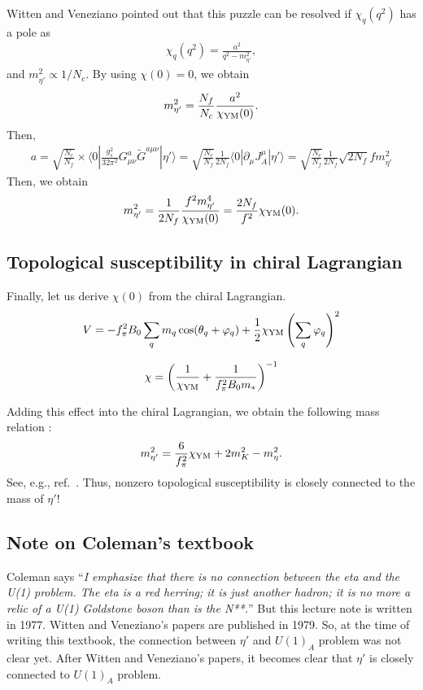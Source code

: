 \documentclass[11pt,a4paper]{article}
\begin{document}
Witten and Veneziano \cite{Witten:1979vv, Veneziano:1979ec} pointed out that this puzzle can be resolved if $\chi_q(q^2)$ has a pole as
\begin{align}
    \chi_q(q^2) = \frac{a^2}{q^2 - m_{\eta'}^2},
\end{align}
and $m_{\eta'}^2 \propto 1/N_c$. By using $\chi(0)=0$, we obtain
\begin{align}
    m_{\eta'}^2 = \frac{N_f}{N_c} \frac{a^2}{\chi_{\rm YM}(0)}.
\end{align}
Then,
\begin{align}
    a = \sqrt{ \frac{N_c}{N_f} } \times \langle 0| \frac{g_s^2}{32\pi^2} G^a_{\mu\nu} \tilde G^{a\mu\nu} |\eta'\rangle = \sqrt{ \frac{N_c}{N_f} } \frac{1}{2N_f} \langle 0 | \partial_\mu J_A^\mu |\eta' \rangle = \sqrt{ \frac{N_c}{N_f} } \frac{1}{2N_f} \sqrt{2N_f} f m_{\eta'}^2
\end{align}
Then, we obtain \cite{Witten:1979vv, Veneziano:1979ec}
\begin{align}
    m_{\eta'}^2
     = \frac{1}{2N_f} \frac{f^2 m_{\eta'}^4}{\chi_{\rm YM}(0)}
     = \frac{2N_f}{f^2} \chi_{\rm YM}(0).
\end{align}

\subsection{Topological susceptibility in chiral Lagrangian}
Finally, let us derive $\chi(0)$ from the chiral Lagrangian.
\begin{align}
    V = -f_\pi^2 B_0 \sum_q m_q \cos(\theta_q + \varphi_q) + \frac{1}{2} \chi_{\rm YM} \left( \sum_q \varphi_q \right)^2
\end{align}

\begin{align}
    \chi = \left( \frac{1}{\chi_{\rm YM}} + \frac{1}{f_\pi^2 B_0 m_*}  \right)^{-1}
\end{align}

Adding this effect into the chiral Lagrangian, we obtain the following mass relation :
\begin{align}
    m_{\eta'}^2 = \frac{6}{f_\pi^2} \chi_{\rm YM} + 2m_K^2 - m_\eta^2.
\end{align}
See, e.g., ref.~\cite{Gabadadze:2002ff}. Thus, nonzero topological susceptibility is closely connected to the mass of $\eta'$!



\subsection{Note on Coleman's textbook}
Coleman \cite{Coleman:1978ae} says ``\textit{I emphasize that there is no connection between the eta and the U(1) problem. The eta is a red herring; it is just another hadron; it is no more a relic of a U(1) Goldstone boson than is the N**.}'' But this lecture note is written in 1977. Witten and Veneziano's papers are published in 1979. So, at the time of writing this textbook, the connection between $\eta'$ and $U(1)_A$ problem was not clear yet. After Witten and Veneziano's papers, it becomes clear that $\eta'$ is closely connected to $U(1)_A$ problem.
\end{document}
